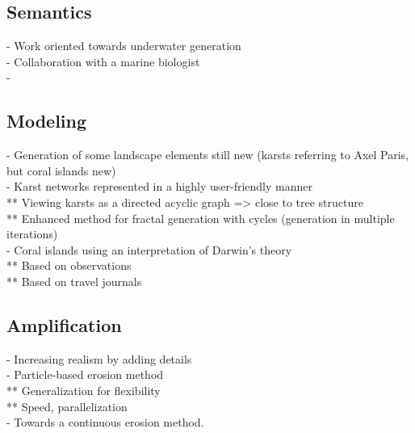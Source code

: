 \subsection{Semantics}
- Work oriented towards underwater generation \\
- Collaboration with a marine biologist \\
- 

\subsection{Modeling}
- Generation of some landscape elements still new (karsts referring to Axel Paris, but coral islands new) \\
- Karst networks represented in a highly user-friendly manner \\
** Viewing karsts as a directed acyclic graph => close to tree structure \\
** Enhanced method for fractal generation with cycles (generation in multiple iterations) \\
- Coral islands using an interpretation of Darwin's theory \\
** Based on observations \\
** Based on travel journals

\subsection{Amplification}
- Increasing realism by adding details \\
- Particle-based erosion method \\
** Generalization for flexibility \\
** Speed, parallelization \\
- Towards a continuous erosion method.
